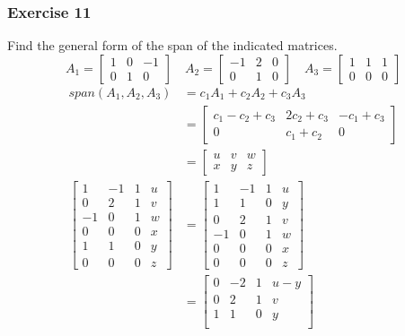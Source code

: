\documentclass{math}
\begin{document}
\subsubsection*{Exercise 11}
Find the general form of the span of the indicated matrices.
\[ A_1 = \begin{bmatrix}1 & 0 & -1 \\ 0 & 1 & 0\end{bmatrix} \quad
  A_2 = \begin{bmatrix}-1 & 2 & 0 \\ 0 & 1 & 0\end{bmatrix} \quad
  A_3 = \begin{bmatrix}1 & 1 & 1 \\ 0 & 0 & 0\end{bmatrix} \]
\begin{align*}
  span(A_1,A_2,A_3) &= c_1A_1+c_2A_2+c_3A_3 \\
  &= \begin{bmatrix}
    c_1-c_2+c_3 & 2c_2+c_3 & -c_1+c_3 \\
    0 & c_1+c_2 & 0
  \end{bmatrix} \\
  &= \begin{bmatrix}
    u & v & w \\
    x & y & z
  \end{bmatrix} \\
  \begin{bmatrix}
    1 & -1 & 1 & u \\
    0 & 2 & 1 & v \\
    -1 & 0 & 1 & w \\
    0 & 0 & 0 & x \\
    1 & 1 & 0 & y \\
    0 & 0 & 0 & z
  \end{bmatrix} &= \begin{bmatrix}
    1 & -1 & 1 & u \\
    1 & 1 & 0 & y \\
    0 & 2 & 1 & v \\
    -1 & 0 & 1 & w \\
    0 & 0 & 0 & x \\
    0 & 0 & 0 & z
  \end{bmatrix} \\
  &= \begin{bmatrix}
    0 & -2 & 1 & u-y \\
    0 & 2 & 1 & v \\
    1 & 1 & 0 & y \\

\end{bmatrix}
\end{align*}
\end{document}
